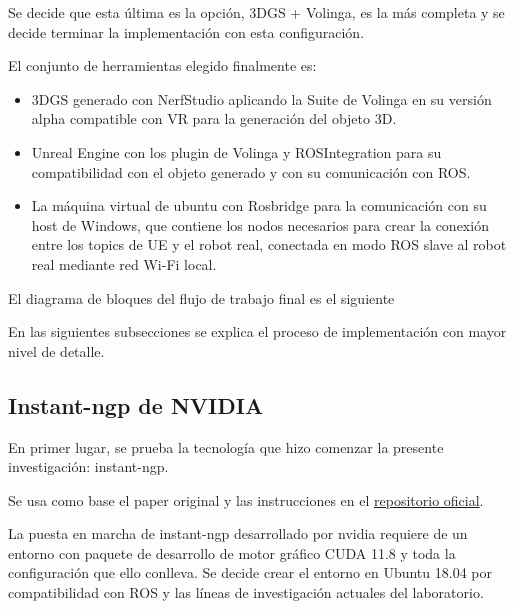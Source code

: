 \documentclass[a4paper, 12pt, spanish, twoside]{article}
\begin{document}
Se decide que esta última es la opción, 3DGS + Volinga, es la más completa y se decide terminar la implementación con esta configuración. 

El conjunto de herramientas elegido finalmente es: 


\begin{itemize} 
\item 3DGS generado con NerfStudio aplicando la Suite de Volinga en su versión alpha compatible con VR para la generación del objeto 3D. 

\item Unreal Engine con los plugin de Volinga y ROSIntegration para su compatibilidad con el objeto generado y con su comunicación con ROS. 

\item La máquina virtual de ubuntu con Rosbridge para la comunicación con su host de Windows, que contiene los nodos necesarios para crear la conexión entre los topics de UE y el robot real, conectada en modo ROS slave al robot real mediante red Wi-Fi local. 
\end{itemize} 

El diagrama de bloques del flujo de trabajo final es el siguiente

En las siguientes subsecciones se explica el proceso de implementación con mayor nivel de detalle. 





\subsection{Instant-ngp de NVIDIA} 

En primer lugar, se prueba la tecnología que hizo comenzar la presente investigación: \gls{instant-ngp}. 

Se usa como base el paper original y las instrucciones en el \href{https://github.com/NVlabs/instant-ngp}{repositorio oficial}.  

La puesta en marcha de \gls{instant-ngp} desarrollado por \gls{nvidia} requiere de un entorno con paquete de desarrollo de motor gráfico CUDA 11.8 y toda la configuración que ello conlleva. Se decide crear el entorno en Ubuntu 18.04 por compatibilidad con ROS y las líneas de investigación actuales del laboratorio. 
\end{document}
